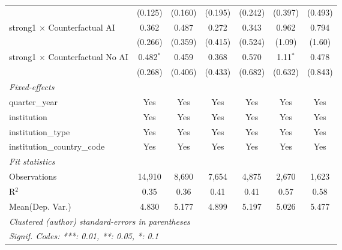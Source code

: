 \begin{tabular}{lcccccc}
                                          & (0.125)      & (0.160)      & (0.195)      & (0.242)      & (0.397)    & (0.493)\\   
   strong1 $\times$ Counterfactual AI     & 0.362        & 0.487        & 0.272        & 0.343        & 0.962      & 0.794\\   
                                          & (0.266)      & (0.359)      & (0.415)      & (0.524)      & (1.09)     & (1.60)\\   
   strong1 $\times$ Counterfactual No AI  & 0.482$^{*}$  & 0.459        & 0.368        & 0.570        & 1.11$^{*}$ & 0.478\\   
                                          & (0.268)      & (0.406)      & (0.433)      & (0.682)      & (0.632)    & (0.843)\\   
   \midrule
   \emph{Fixed-effects}\\
   quarter\_year                          & Yes          & Yes          & Yes          & Yes          & Yes        & Yes\\  
   institution                            & Yes          & Yes          & Yes          & Yes          & Yes        & Yes\\  
   institution\_type                      & Yes          & Yes          & Yes          & Yes          & Yes        & Yes\\  
   institution\_country\_code             & Yes          & Yes          & Yes          & Yes          & Yes        & Yes\\  
   \midrule
   \emph{Fit statistics}\\
   Observations                           & 14,910       & 8,690        & 7,654        & 4,875        & 2,670      & 1,623\\  
   R$^2$                                  & 0.35         & 0.36         & 0.41         & 0.41         & 0.57       & 0.58\\  
Mean(Dep. Var.) & 4.830 & 5.177 & 4.899 & 5.197 & 5.026 & 5.477 \\
   \midrule \midrule
   \multicolumn{7}{l}{\emph{Clustered (author) standard-errors in parentheses}}\\
   \multicolumn{7}{l}{\emph{Signif. Codes: ***: 0.01, **: 0.05, *: 0.1}}\\
\end{tabular}
\par\endgroup
